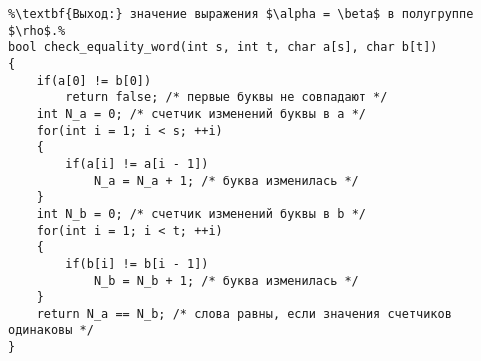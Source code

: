 \documentclass{article}
\begin{document}
\begin{lstlisting}[escapechar=\%]
%\noindent\textbf{Вход:} входные слова $\alpha$: \textbf{array} [1..s] \textbf{of} \{a, b\} и $\beta$: \textbf{array} [1..t] \textbf{of} \{a, b\}.%
%\textbf{Выход:} значение выражения $\alpha = \beta$ в полугруппе $\rho$.%
bool check_equality_word(int s, int t, char a[s], char b[t])
{
	if(a[0] != b[0])
		return false; /* первые буквы не совпадают */
	int N_a = 0; /* счетчик изменений буквы в a */
	for(int i = 1; i < s; ++i)
	{
		if(a[i] != a[i - 1])
			N_a = N_a + 1; /* буква изменилась */
	}
	int N_b = 0; /* счетчик изменений буквы в b */
	for(int i = 1; i < t; ++i)
	{
		if(b[i] != b[i - 1])
			N_b = N_b + 1; /* буква изменилась */
	}
	return N_a == N_b; /* слова равны, если значения счетчиков одинаковы */
}
\end{lstlisting}
\end{document}
